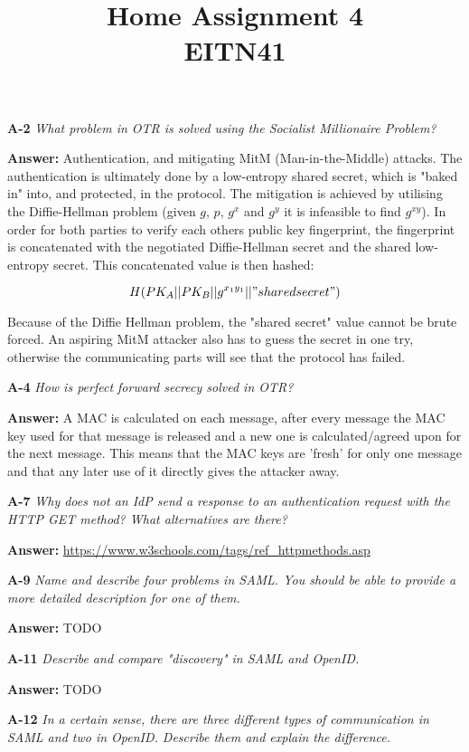 \documentclass[a4paper]{article}
\title{Home Assignment 4 \\ EITN41}
\author{}
\date{}
\newcommand{\Q}[2]{ \vspace{10pt} \textbf{A-#1} \textit{#2} }
\newcommand{\A}[1]{ \textbf{Answer:} #1 }
\begin{document}
\maketitle

\Q{2} { %
    What problem in OTR is solved using the Socialist Millionaire Problem?
}

\A{
    Authentication, and mitigating MitM (Man-in-the-Middle) attacks. 
    The authentication is ultimately done by a low-entropy shared
    secret, which is "baked in" into, and protected, in the protocol.
    The mitigation is achieved by utilising the Diffie-Hellman
    problem (given $g$, $p$, $g^x$ and $g^y$ it is infeasible 
    to find $g^{xy}$). In order for both parties to verify 
    each others public key fingerprint, the fingerprint is
    concatenated with the negotiated Diffie-Hellman secret 
    and the shared low-entropy secret. This concatenated value 
    is then hashed:

    $$H(PK_A || PK_B || g^{x_1y_1} || "shared secret")$$

    Because of the Diffie Hellman problem, the "shared secret" value 
    cannot be brute forced. An aspiring MitM attacker also has
    to guess the secret in one try, otherwise the communicating
    parts will see that the protocol has failed.
}

\Q{4} {
    How is perfect forward secrecy solved in OTR?
}

\A{
    A MAC is calculated on each message, after every message the MAC key used 
    for that message is released and a new one is calculated/agreed upon
    for the next message. This means that the MAC keys are 'fresh' for only
    one message and that any later use of it directly gives
    the attacker away.
}

\Q{7} {
    Why does not an IdP send a response to an authentication request with the 
    HTTP GET method? What alternatives are there?
}

\A{
    \url{https://www.w3schools.com/tags/ref_httpmethods.asp}
}

\Q{9} {
    Name and describe four problems in SAML. You should be able to provide a 
    more detailed description for one of them.
}

\A{
    TODO
}

\Q{11} {
    Describe and compare "discovery" in SAML and OpenID.
}

\A{
    TODO
}

\Q{12} {
    In a certain sense, there are three different types of communication in 
    SAML and two in OpenID. Describe them and explain the difference.
}
\end{document}
